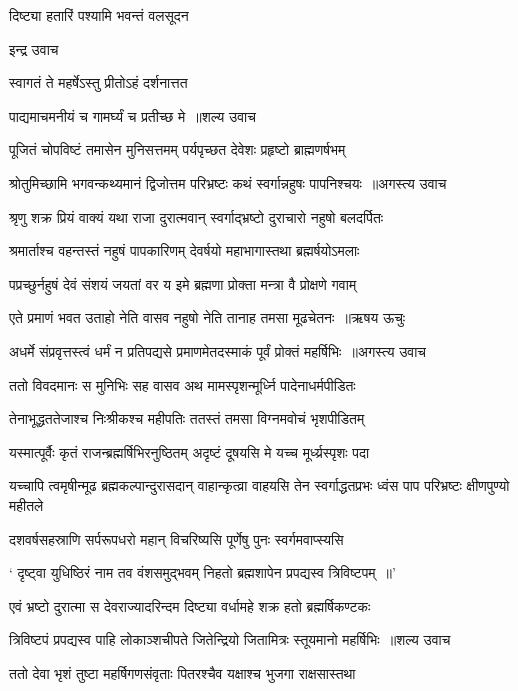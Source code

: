दिष्ट्या हतारिं पश्यामि भवन्तं वलसूदन

इन्द्र उवाच

स्वागतं ते महर्षेऽस्तु प्रीतोऽहं दर्शनात्तत

पाद्यमाचमनीयं च गामर्घ्यं च प्रतीच्छ मे ॥शल्य उवाच


\twolineshloka
{पूजितं चोपविष्टं तमासेन मुनिसत्तमम्}
{पर्यपृच्छत देवेशः प्रहृष्टो ब्राह्मणर्षभम्}


\threelineshloka
{श्रोतुमिच्छामि भगवन्कथ्यमानं द्विजोत्तम}
{परिभ्रष्टः कथं स्वर्गान्नहुषः पापनिश्चयः ॥अगस्त्य उवाच}
{}


\twolineshloka
{श्रृणु शक्र प्रियं वाक्यं यथा राजा दुरात्मवान्}
{स्वर्गाद्भ्रष्टो दुराचारो नहुषो बलदर्पितः}


\twolineshloka
{श्रमार्ताश्च वहन्तस्तं नहुषं पापकारिणम्}
{देवर्षयो महाभागास्तथा ब्रह्मर्षयोऽमलाः}


\twolineshloka
{पप्रच्छुर्नहुषं देवं संशयं जयतां वर}
{य इमे ब्रह्मणा प्रोक्ता मन्त्रा वै प्रोक्षणे गवाम्}


\threelineshloka
{एते प्रमाणं भवत उताहो नेति वासव}
{नहुषो नेति तानाह तमसा मूढचेतनः ॥ऋषय ऊचुः}
{}


\threelineshloka
{अधर्मे संप्रवृत्तस्त्वं धर्मं न प्रतिपद्यसे}
{प्रमाणमेतदस्माकं पूर्वं प्रोक्तं महर्षिभिः ॥अगस्त्य उवाच}
{}


\twolineshloka
{ततो विवदमानः स मुनिभिः सह वासव}
{अथ मामस्पृशन्मूर्ध्नि पादेनाधर्मपीडितः}


\twolineshloka
{तेनाभूद्धततेजाश्च निःश्रीकश्च महीपतिः}
{ततस्तं तमसा विग्नमवोचं भृशपीडितम्}


\twolineshloka
{यस्मात्पूर्वैः कृतं राजन्ब्रह्मर्षिभिरनुष्ठितम्}
{अदृष्टं दूषयसि मे यच्च मूर्ध्य्रस्पृशः पदा}


यच्चापि त्वमृषीन्मूढ ब्रह्मकल्पान्दुरासदान्
\twolineshloka
{वाहान्कृत्व्रा वाहयसि तेन स्वर्गाद्धतप्रभः}
{ध्वंस पाप परिभ्रष्टः क्षीणपुण्यो महीतले}


\twolineshloka
{दशवर्षसहस्राणि सर्परूपधरो महान्}
{विचरिष्यसि पूर्णेषु पुनः स्वर्गमवाप्स्यसि}


\twolineshloka
{` दृष्ट्वा युधिष्ठिरं नाम तव वंशसमुद्भवम्}
{निहतो ब्रह्मशापेन प्रपद्यस्व त्रिविष्टपम् ॥'}


\twolineshloka
{एवं भ्रष्टो दुरात्मा स देवराज्यादरिन्दम}
{दिष्ट्या वर्धामहे शक्र हतो ब्रह्मर्षिकण्टकः}


\threelineshloka
{त्रिविष्टपं प्रपद्यस्व पाहि लोकाञ्शचीपते}
{जितेन्द्रियो जितामित्रः स्तूयमानो महर्षिभिः ॥शल्य उवाच}
{}


\twolineshloka
{ततो देवा भृशं तुष्टा महर्षिगणसंवृताः}
{पितरश्चैव यक्षाश्च भुजगा राक्षसास्तथा}


